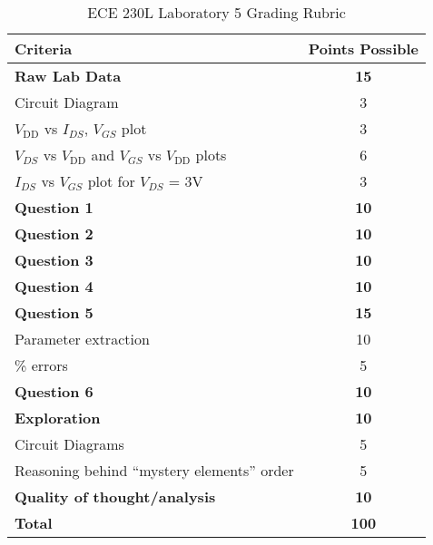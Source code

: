 \documentclass[12pt]{../manual}
\begin{document}
%
\newpage
{}
{}
\hspace{0pt}
\vfill %
\begin{table}[ht!]
\caption{ECE 230L Laboratory 5 Grading Rubric}
\centering
\begin{tabular}{l|c} \hline
Criteria & Points Possible \\ \hline \hline
\textbf{Raw Lab Data} 							& \textbf{15} \\
Circuit Diagram 								& 3 \\
$V_{\mathrm{DD}}$ vs $I_{DS}$, $V_{GS}$ plot & 3 \\
$V_{DS}$ vs $V_{\mathrm{DD}}$ and $V_{GS}$ vs $V_{\mathrm{DD}}$ plots 	& 6 \\
$I_{DS}$ vs $V_{GS}$ plot for $V_{DS}$ = 3V 		& 3 \\ \hline
\textbf{Question 1} 							& \textbf{10} \\ \hline
\textbf{Question 2} 							& \textbf{10} \\ \hline
\textbf{Question 3} 							& \textbf{10} \\ \hline
\textbf{Question 4} 							& \textbf{10} \\ \hline
\textbf{Question 5} 							& \textbf{15} \\
Parameter extraction							& 10 \\ 
\% errors										& 5 \\ \hline
\textbf{Question 6} 							& \textbf{10} \\ \hline
\textbf{Exploration} 							& \textbf{10} \\
Circuit Diagrams								& 5 \\
Reasoning behind ``mystery elements'' order		& 5 \\ \hline
\textbf{Quality of thought/analysis} 			& \textbf{10} \\ \hline \hline
\textbf{Total} 									& \textbf{100} \\ \hline
\end{tabular}
\end{table}
\vfill %
\end{document}
